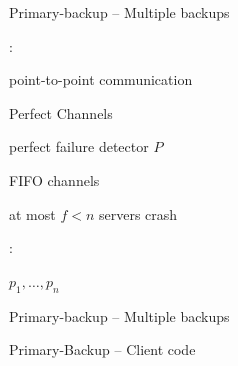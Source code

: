 \begin{frame}{Primary-backup -- Multiple backups}

:

\BI
\item point-to-point communication
\item \alert{Perfect Channels}
\item perfect failure detector $P$
\item FIFO channels
\item at most $f < n$ servers crash
\EI

\bigskip
{}:
\BI
\item $p_1, \ldots, p_n$
\EI	

\end{frame}

\begin{frame}[shrink]{Primary-backup -- Multiple backups}

\begin{Procedure}
\caption{Protocol executed by process $p_i$}
\BlankLine
{}
\BlankLine
{}
\end{Procedure}

\end{frame}

\begin{frame}[shrink]{Primary-Backup -- Client code}

\begin{Procedure}
\caption{Protocol executed by client $c$}

\BlankLine
{}
\BlankLine
{}
\BlankLine
{}
\end{Procedure}	
	
\end{frame}


